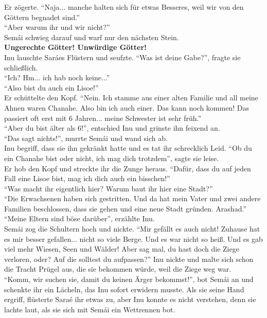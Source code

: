\documentclass[a4paper,12pt]{book}
\begin{document}
Er zögerte. ``Naja... manche halten sich für etwas Besseres, weil wir von den Göttern begnadet 
sind.''\\
``Aber warum ihr und wir nicht?''\\
Semái schwieg darauf und warf nur den nächsten Stein.\\
\textbf{Ungerechte Götter! Unwürdige Götter!}\\
Inu lauschte Saráes Flüstern und seufzte. ``Was ist deine Gabe?'', fragte sie schließlich.\\
``Ich? Hm... ich hab noch keine...''\\
``Also bist du auch ein Lisoe!''\\
Er schüttelte den Kopf. ``Nein. Ich stamme aus einer alten Familie und all meine Ahnen waren 
Chanahe. Also bin ich auch einer. Das kann noch kommen! Das passiert oft erst mit 6 Jahren... meine 
Schwester ist sehr früh.''\\
``Aber du bist älter als 6!'', entschied Inu und grinste ihn feixend an.\\
``Das sagt nichts!'', murrte Semái und wand sich ab. \\
Inu begriff, dass sie ihn gekränkt hatte und es tat ihr schrecklich Leid. ``Ob du ein Chanahe bist 
oder nicht, ich mag dich trotzdem'', sagte sie leise.\\
Er hob den Kopf und streckte ihr die Zunge heraus. ``Dafür, dass du auf jeden Fall eine Lisoe bist, 
mag ich dich auch ein bisschen!'' \\
``Was macht ihr eigentlich hier? Warum baut ihr hier eine Stadt?''\\
``Die Erwachsenen haben sich gestritten. Und da hat mein Vater und zwei andere Familien 
beschlossen, dass sie gehen und eine neue Stadt gründen. Arashad.''\\
``Meine Eltern sind böse darüber'', erzählte Inu.\\
Semái zog die Schultern hoch und nickte. ``Mir gefällt es auch nicht! Zuhause hat es mir besser 
gefallen... nicht so viele Berge. Und es war nicht so heiß. Und es gab viel mehr Wiesen, Seen und 
Wälder! Aber sag mal, du hast doch die Ziege verloren, oder? Auf die solltest du aufpassen?''
Inu nickte und malte sich schon die Tracht Prügel aus, die sie bekommen würde, weil die Ziege weg 
war.\\
``Komm, wir suchen sie, damit du keinen Ärger bekommst!'', bot Semái an und schenkte ihr ein 
Lächeln, das Inu sofort erwidern musste. Als sie seine Hand ergriff, flüsterte Saraé ihr etwas zu, 
aber Inu konnte es nicht verstehen, denn sie lachte laut, als sie sich mit Semái ein Wettrennen 
bot. \\
\end{document}
